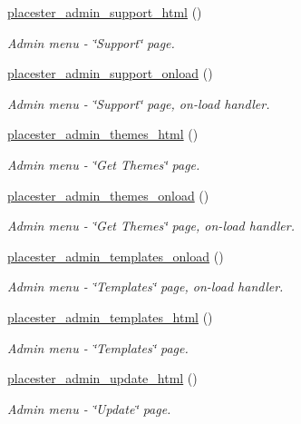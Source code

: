 \begin{DoxyCompactItemize}
\hyperlink{admin_2init_8php_a69655a694933dc840d4696bc034483ce}{placester\_\-admin\_\-support\_\-html} ()
\begin{DoxyCompactList}\small\item\em Admin menu -\/ \char`\"{}Support\char`\"{} page. \end{DoxyCompactList}\item 
\hyperlink{admin_2init_8php_a74f21840844af358ed14c48a3d64e531}{placester\_\-admin\_\-support\_\-onload} ()
\begin{DoxyCompactList}\small\item\em Admin menu -\/ \char`\"{}Support\char`\"{} page, on-\/load handler. \end{DoxyCompactList}\item 
\hyperlink{admin_2init_8php_a9ec90dbab99683546d5d255d11e2e013}{placester\_\-admin\_\-themes\_\-html} ()
\begin{DoxyCompactList}\small\item\em Admin menu -\/ \char`\"{}Get Themes\char`\"{} page. \end{DoxyCompactList}\item 
\hyperlink{admin_2init_8php_a40a1b95924b3d219ecb223653d68ce16}{placester\_\-admin\_\-themes\_\-onload} ()
\begin{DoxyCompactList}\small\item\em Admin menu -\/ \char`\"{}Get Themes\char`\"{} page, on-\/load handler. \end{DoxyCompactList}\item 
\hyperlink{admin_2init_8php_af1eec436a5c53d66054df688277d86b4}{placester\_\-admin\_\-templates\_\-onload} ()
\begin{DoxyCompactList}\small\item\em Admin menu -\/ \char`\"{}Templates\char`\"{} page, on-\/load handler. \end{DoxyCompactList}\item 
\hyperlink{admin_2init_8php_aa1103fc634ef61e0070ce7ed07d6c841}{placester\_\-admin\_\-templates\_\-html} ()
\begin{DoxyCompactList}\small\item\em Admin menu -\/ \char`\"{}Templates\char`\"{} page. \end{DoxyCompactList}\item 
\hyperlink{admin_2init_8php_aa80c0f56cf4f54a59855bf1c6ac63001}{placester\_\-admin\_\-update\_\-html} ()
\begin{DoxyCompactList}\small\item\em Admin menu -\/ \char`\"{}Update\char`\"{} page. \end{DoxyCompactList}\item 

\end{DoxyCompactItemize}
